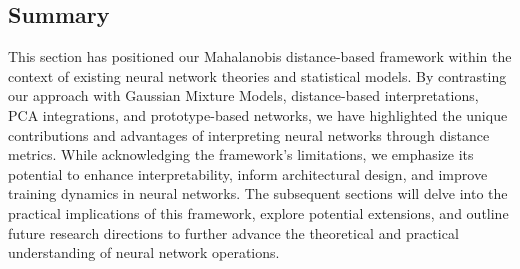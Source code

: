 \subsection{Summary}

This section has positioned our Mahalanobis distance-based framework within the context of existing neural network theories and statistical models. By contrasting our approach with Gaussian Mixture Models, distance-based interpretations, PCA integrations, and prototype-based networks, we have highlighted the unique contributions and advantages of interpreting neural networks through distance metrics. While acknowledging the framework's limitations, we emphasize its potential to enhance interpretability, inform architectural design, and improve training dynamics in neural networks. The subsequent sections will delve into the practical implications of this framework, explore potential extensions, and outline future research directions to further advance the theoretical and practical understanding of neural network operations.

